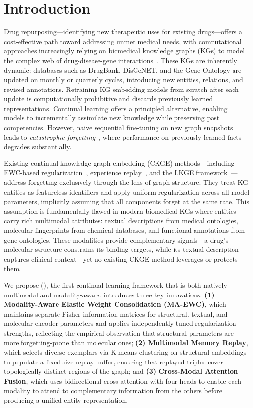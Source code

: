 \section{Introduction}
\label{sec:intro}

Drug repurposing---identifying new therapeutic uses for existing drugs---offers a cost-effective path toward addressing unmet medical needs, with computational approaches increasingly relying on biomedical knowledge graphs (KGs) to model the complex web of drug-disease-gene interactions~\citep{chandak2023building, huang2024zero}.
These KGs are inherently dynamic: databases such as DrugBank, DisGeNET, and the Gene Ontology are updated on monthly or quarterly cycles, introducing new entities, relations, and revised annotations.
Retraining KG embedding models from scratch after each update is computationally prohibitive and discards previously learned representations.
Continual learning offers a principled alternative, enabling models to incrementally assimilate new knowledge while preserving past competencies.
However, naive sequential fine-tuning on new graph snapshots leads to \emph{catastrophic forgetting}~\citep{kirkpatrick2017overcoming}, where performance on previously learned facts degrades substantially.

Existing continual knowledge graph embedding (CKGE) methods---including EWC-based regularization~\citep{kirkpatrick2017overcoming}, experience replay~\citep{rolnick2019experience}, and the LKGE framework~\citep{cui2023lifelong}---address forgetting exclusively through the lens of graph structure.
They treat KG entities as featureless identifiers and apply uniform regularization across all model parameters, implicitly assuming that all components forget at the same rate.
This assumption is fundamentally flawed in modern biomedical KGs where entities carry rich multimodal attributes: textual descriptions from medical ontologies, molecular fingerprints from chemical databases, and functional annotations from gene ontologies.
These modalities provide complementary signals---a drug's molecular structure constrains its binding targets, while its textual description captures clinical context---yet no existing CKGE method leverages or protects them.

We propose \fullname (\ours), the first continual learning framework that is both natively multimodal and modality-aware.
\ours introduces three key innovations:
\textbf{(1) Modality-Aware Elastic Weight Consolidation (MA-EWC)}, which maintains separate Fisher information matrices for structural, textual, and molecular encoder parameters and applies independently tuned regularization strengths, reflecting the empirical observation that structural parameters are more forgetting-prone than molecular ones;
\textbf{(2) Multimodal Memory Replay}, which selects diverse exemplars via K-means clustering on structural embeddings to populate a fixed-size replay buffer, ensuring that replayed triples cover topologically distinct regions of the graph; and
\textbf{(3) Cross-Modal Attention Fusion}, which uses bidirectional cross-attention with four heads to enable each modality to attend to complementary information from the others before producing a unified entity representation.

